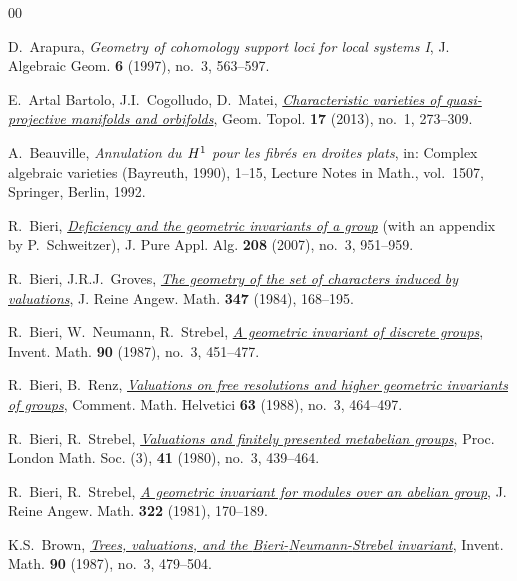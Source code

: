 \documentclass[11pt]{amsart}
\theoremstyle{definition}
\begin{document}
\begin{thebibliography}{00}

 D.~Arapura, 
{\em Geometry of cohomology support loci for local systems  {\rm I}}, 
J. Algebraic Geom. \textbf{6} (1997), no.~3, 563--597.  

  E.~Artal Bartolo, J.I.~Cogolludo, D.~Matei,
\href{https://doi.org/10.2140/gt.2013.17.273}%
{\em Characteristic varieties of quasi-projective manifolds and orbifolds},
Geom. Topol. \textbf{17} (2013), no.~1, 273--309.

 A.~Beauville, 
{\em Annulation du $H\sp 1$ pour les fibr\' es en droites plats}, in: 
Complex algebraic varieties (Bayreuth, 1990), 1--15,
Lecture Notes in Math., vol.~1507, Springer, Berlin, 1992. 

 R.~Bieri,
\href{https://dx.doi.org/10.1016/j.jpaa.2006.02.003}%
{\em Deficiency and the geometric invariants of a group}\/  
(with an appendix by P.~Schweitzer), 
J. Pure Appl. Alg. \textbf{208} (2007), no.~3, 951--959. 

 R.~Bieri, J.R.J.~Groves,
\href{https://dx.doi.org/10.1515/crll.1984.347.168}%
{\em The geometry of the set of characters induced by valuations}\/,
J. Reine Angew. Math. \textbf{347} (1984), 168--195.

 R.~Bieri, W.~Neumann, R.~Strebel, 
\href{https://dx.doi.org/10.1007/BF01389175}%
{\em A geometric invariant of discrete groups}, 
Invent. Math. \textbf{90} (1987), no.~3, 451--477. 

 R.~Bieri, B.~Renz,
\href{https://dx.doi.org/10.1007/BF02566775}%
{\em Valuations on free resolutions and higher geometric 
invariants of groups}, Comment. Math. Helvetici 
\textbf{63} (1988), no.~3, 464--497.

 R.~Bieri, R.~Strebel, 
\href{http://dx.doi.org/10.1112/plms/s3-41.3.439}%
{\em Valuations and finitely presented metabelian groups}, 
Proc. London Math. Soc. (3), \textbf{41} (1980), no.~3, 439--464. 

 R.~Bieri, R.~Strebel, 
\href{https://doi.org/10.1515/crll.1981.322.170}%
{\em A geometric invariant for modules over an abelian group}, 
J. Reine Angew. Math. \textbf{322} (1981), 170--189.

 K.S.~Brown,
\href{https://dx.doi.org/10.1007/BF01389176}%
{\em Trees, valuations, and the {B}ieri-{N}eumann-{S}trebel 
invariant}, Invent. Math. \textbf{90} (1987), no.~3, 479--504. 



\end{thebibliography}
\end{document}
